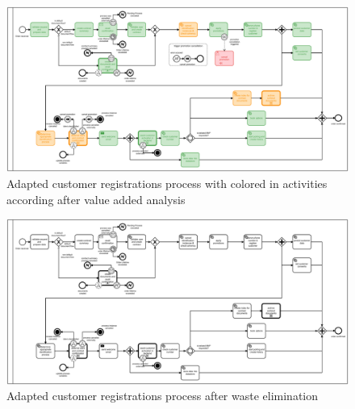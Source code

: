 \begin{figure}[H]
	\centering
	\includegraphics[width=1.7\columnwidth, angle=90]{graphics/register-customer/6-registercustomer-vaa.pdf}
	\caption{Adapted customer registrations process with colored in activities according after value added analysis} 
	\label{fig:process-vaa} 
\end{figure}

\begin{figure}[H]
	\centering
	\includegraphics[width=1.7\columnwidth, angle=90]{graphics/register-customer/7-registercustomer-waste-elimination.pdf}
	\caption{Adapted customer registrations process after waste elimination} 
	\label{fig:process-vaa-waste} 
\end{figure}